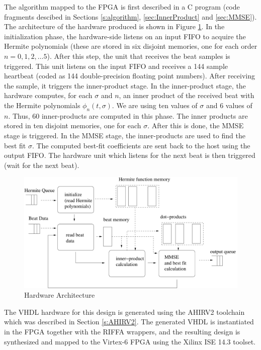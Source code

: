 \documentclass[conference]{IEEEtran}
\begin{document}
The algorithm mapped to the FPGA 
is first described in a C program (code fragments descibed in Sections \ref{s:algorithm},  \ref{sec:InnerProduct} and \ref{sec:MMSE}).
The architecture of the hardware produced is shown in Figure \ref{fig:HardwareArchitecture}.
In the initialization phase, the hardware-side listens on an input FIFO to acquire
the Hermite polynomials (these are stored in six disjoint memories, one
for each order $n=0,1,2,\ldots 5$).  After this step, the unit that receives
the beat samples is triggered.  This unit listens on the input FIFO and receives a 144 sample
heartbeat (coded as 144 double-precision floating point numbers).  After receiving
the sample, it triggers the inner-product stage.  In the inner-product stage, the hardware computes, for each $\sigma$ and
$n$, an inner product of the received beat with the Hermite polynomials $\phi_n(t,\sigma)$.
We are using ten values of $\sigma$ and $6$ values of $n$.  Thus, 60 inner-products
are computed in this phase.  The inner products are stored in ten
disjoint memories, one for each $\sigma$.  After this is done, the MMSE
stage is triggered.  In the MMSE stage, the inner-products are used to find the best fit $\sigma$.
The computed best-fit coefficients are sent back to the host using the output FIFO.
The hardware unit which listens for the next beat is then triggered (wait for the next beat).

\begin{figure}
\begin{center}
	\includegraphics[width=\linewidth]{HardwareArchitecture.pdf}
	\caption{Hardware Architecture}
	\label{fig:HardwareArchitecture}
\end{center}
\end{figure}

The VHDL hardware for this design is generated using the AHIRV2 toolchain
which was described in Section \ref{s:AHIRV2}.  
The generated VHDL is instantiated in the FPGA together with the RIFFA wrappers,
and the resulting design is synthesized and mapped to the Virtex-6 FPGA using
the Xilinx ISE 14.3 toolset.
\end{document}
